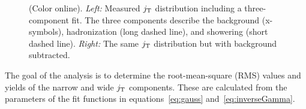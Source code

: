   \begin{figure}
    \begin{center}
    \end{center}
    \caption{(Color online). \emph{Left:} Measured $j_{\rm T}$ distribution including a three-component fit. The three components describe the background (x-symbols), hadronization (long dashed line), and showering (short dashed line). \emph{Right:} The same $j_{\rm T}$ distribution but with background subtracted.}
    \label{fig:jtdistribution}
  \end{figure}

The goal of the analysis is to determine the root-mean-square (RMS) values and yields of the narrow and wide $j_{\rm T}$ components. These are calculated from the parameters of the fit functions in equations~\eqref{eq:gauss} and~\eqref{eq:inverseGamma}.

